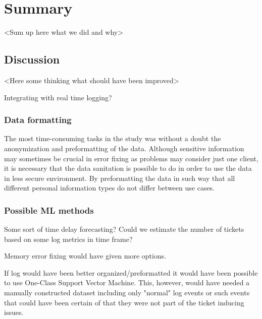 
\section{Summary}\label{sec:summary}

<Sum up here what we did and why>

\subsection{Discussion}\label{subsec:discussion}
<Here some thinking what should have been improved>

Integrating with real time logging?

\subsubsection*{Data formatting}
The most time-consuming tasks in the study
was without a doubt
the anonymization and preformatting of the data.
Although sensitive information may sometimes be crucial in error fixing
as problems may consider just one client,
it is necessary that the data sanitation is possible to do
in order to use the data in less secure environment.
By preformatting the data in such way
that all different personal information types
do not differ between use cases.


\subsubsection*{Possible ML methods}
Some sort of time delay forecasting?\cite{erharter2021pointlessness}
Could we estimate the number of tickets
based on some log metrics in time frame?

Memory error fixing would have given more options.


If log would have been better organized/preformatted
it would have been possible to use One-Class Support Vector Machine.
This, however,
would have needed a manually constructed dataset
including only "normal" log events
or such events that could have been certain of
that they were not part of the ticket inducing issues.


